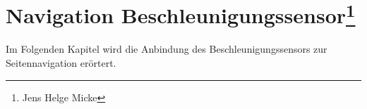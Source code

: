 \chapter[Navigation Beschleunigungssensor]{Navigation Beschleunigungssensor\footnote{Jens Helge Micke}}
\thispagestyle{fancy}
\label{Beschleunigungssensor}
Im Folgenden Kapitel wird die Anbindung des Beschleunigungssensors zur Seitennavigation erörtert.